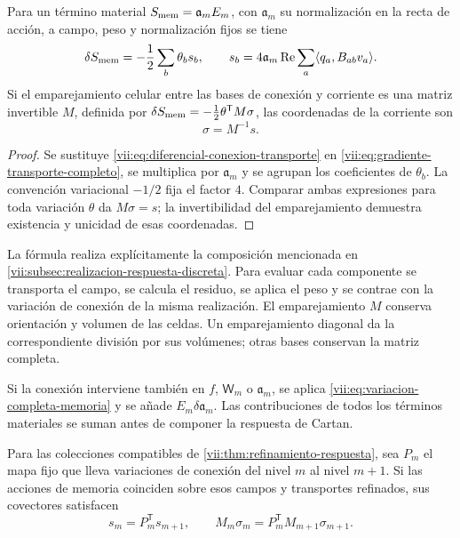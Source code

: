 \begin{theorem}
\label{vii:thm:corriente-conexion-evaluada}
Para un término material \(S_{\rm mem}=\mathfrak a_m E_m\),
con \(\mathfrak a_m\) su normalización en la recta de acción,
a campo, peso y normalización fijos se tiene
\begin{equation}
 \delta S_{\rm mem}=-\frac12\sum_b\theta_b s_b,\qquad
 s_b=4\mathfrak a_m\operatorname{Re}
        \sum_a\langle q_a,B_{ab}v_a\rangle.
 \label{vii:eq:componentes-corriente-conexion}
\end{equation}
Si el emparejamiento celular entre las bases de conexión y corriente
es una matriz invertible \(M\), definida por
\(\delta S_{\rm mem}=-\tfrac12\theta^{\mathsf T}M\sigma\),
las coordenadas de la corriente son
\begin{equation}
 \sigma=M^{-1}s.
 \label{vii:eq:coordenadas-corriente-material}
\end{equation}
\end{theorem}

\begin{proof}
Se sustituye \eqref{vii:eq:diferencial-conexion-transporte} en
\eqref{vii:eq:gradiente-transporte-completo}, se multiplica por
\(\mathfrak a_m\) y se agrupan los coeficientes de
\(\theta_b\). La convención variacional \(-1/2\) fija el
factor \(4\). Comparar ambas expresiones para toda variación
\(\theta\) da \(M\sigma=s\); la invertibilidad del
emparejamiento demuestra existencia y unicidad de esas coordenadas.
\end{proof}

La fórmula realiza explícitamente la composición mencionada en
\ref{vii:subsec:realizacion-respuesta-discreta}. Para evaluar cada
componente se transporta el campo, se calcula el residuo, se aplica el
peso y se contrae con la variación de conexión de la misma realización.
El emparejamiento \(M\) conserva orientación y volumen de las celdas.
Un emparejamiento diagonal da la correspondiente división por sus
volúmenes; otras bases conservan la matriz completa.

Si la conexión interviene también en \(f\), \(\mathsf W_m\)
o \(\mathfrak a_m\), se aplica
\eqref{vii:eq:variacion-completa-memoria} y se añade
\(E_m\delta\mathfrak a_m\). Las contribuciones de todos los
términos materiales se suman antes de componer la respuesta de Cartan.

\begin{corollary}
\label{vii:cor:refinamiento-corriente-conexion}
Para las colecciones compatibles de
\ref{vii:thm:refinamiento-respuesta}, sea \(P_m\) el mapa fijo
que lleva variaciones de conexión del nivel \(m\) al nivel
\(m+1\). Si las acciones de memoria coinciden sobre esos campos
y transportes refinados, sus covectores satisfacen
\[
 s_m=P_m^{\mathsf T}s_{m+1},\qquad
 M_m\sigma_m=P_m^{\mathsf T}M_{m+1}\sigma_{m+1}.
\]
\end{corollary}

